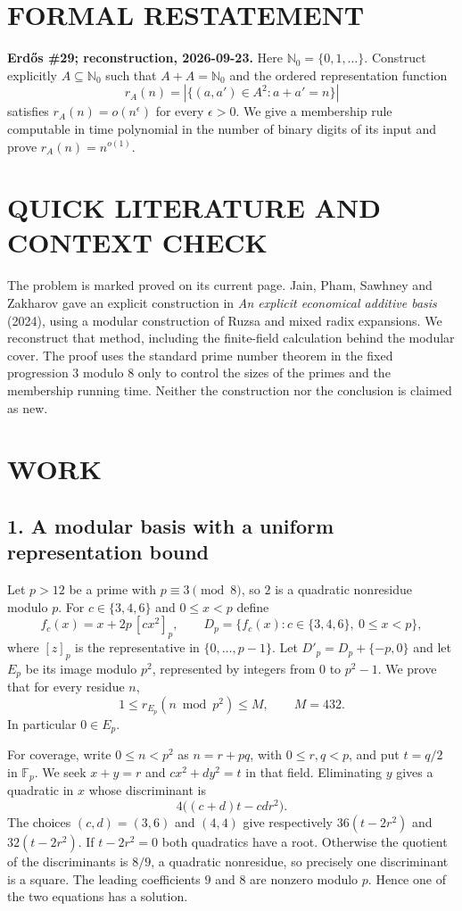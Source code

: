 \section{FORMAL RESTATEMENT}
\textbf{Erd\H{o}s \#29; reconstruction, 2026-09-23.}
Here $\mathbb N_0=\{0,1,\ldots\}$. Construct explicitly
$A\subseteq\mathbb N_0$ such that $A+A=\mathbb N_0$ and the ordered
representation function
\[
 r_A(n)=|\{(a,a')\in A^2:a+a'=n\}|
\]
satisfies $r_A(n)=o(n^\epsilon)$ for every $\epsilon>0$.
We give a membership rule computable in time polynomial in the number
of binary digits of its input and prove $r_A(n)=n^{o(1)}$.

\section{QUICK LITERATURE AND CONTEXT CHECK}
The problem is marked proved on its current page. Jain, Pham, Sawhney
and Zakharov gave an explicit construction in \emph{An explicit
economical additive basis} (2024), using a modular construction of
Ruzsa and mixed radix expansions. We reconstruct that method, including
the finite-field calculation behind the modular cover. The proof uses
the standard prime number theorem in the fixed progression $3$ modulo
$8$ only to control the sizes of the primes and the membership running
time. Neither the construction nor the conclusion is claimed as new.

\section{WORK}
\subsection{1. A modular basis with a uniform representation bound}
Let $p>12$ be a prime with $p\equiv3\pmod8$, so $2$ is a quadratic
nonresidue modulo $p$. For $c\in\{3,4,6\}$ and $0\leq x<p$ define
\[
 f_c(x)=x+2p\,[cx^2]_p,\qquad
 D_p=\{f_c(x):c\in\{3,4,6\},\ 0\leq x<p\},
\]
where $[z]_p$ is the representative in $\{0,\ldots,p-1\}$.
Let $D'_p=D_p+\{-p,0\}$ and let $E_p$ be its image modulo $p^2$,
represented by integers from $0$ to $p^2-1$.
We prove that for every residue $n$,
\[
 1\leq r_{E_p}(n\bmod p^2)\leq M,\qquad M=432.      \tag{1}
\]
In particular $0\in E_p$.

For coverage, write $0\leq n<p^2$ as $n=r+pq$, with $0\leq r,q<p$,
and put $t=q/2$ in $\mathbb F_p$. We seek $x+y=r$ and
$cx^2+dy^2=t$ in that field. Eliminating $y$ gives a quadratic in $x$
whose discriminant is
\[
 4\big((c+d)t-cd r^2\big).
\]
The choices $(c,d)=(3,6)$ and $(4,4)$ give respectively
$36(t-2r^2)$ and $32(t-2r^2)$. If $t-2r^2=0$ both quadratics have
a root. Otherwise the quotient of the discriminants is $8/9$, a
quadratic nonresidue, so precisely one discriminant is a square.
The leading coefficients $9$ and $8$ are nonzero modulo $p$.
Hence one of the two equations has a solution.

